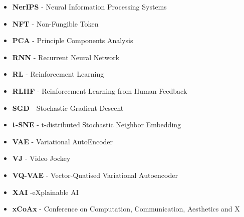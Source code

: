 \begin{itemize}
\item \textbf{NerIPS} - Neural Information Processing Systems
\item \textbf{NFT} - Non-Fungible Token
\item \textbf{PCA} - Principle Components Analysis
\item \textbf{RNN} - Recurrent Neural Network
\item \textbf{RL} - Reinforcement Learning
\item \textbf{RLHF} - Reinforcement Learning from Human Feedback
\item \textbf{SGD} - Stochastic Gradient Descent
\item \textbf{t-SNE} - t-distributed Stochastic Neighbor Embedding
\item \textbf{VAE} - Variational AutoEncoder
\item \textbf{VJ} - Video Jockey
\item \textbf{VQ-VAE} - Vector-Quatised Variational Autoencoder
\item \textbf{XAI} -eXplainable AI
\item \textbf{xCoAx} - Conference on Computation, Communication, Aesthetics and X
\end{itemize}